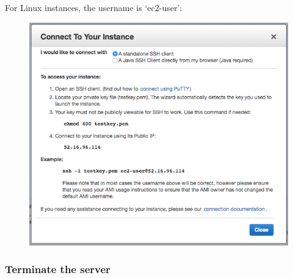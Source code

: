 For Linux instances, the username is `ec2-user':

\begin{Shaded}
\begin{Highlighting}[]
\NormalTok{$ } \KeywordTok{<}\KeywordTok{>} \KeywordTok{<}\KeywordTok{>}
\end{Highlighting}
\end{Shaded}

\begin{figure}[htbp]
\centering
\includegraphics{96Cloud/figures/connect_to_instance.png}
\end{figure}

\begin{Shaded}
\begin{Highlighting}[]
       \KeywordTok{__|}  \KeywordTok{__|_}  \NormalTok{)}
       \KeywordTok{_|} \DataTypeTok{\textbackslash{}(}     \KeywordTok{/}   
      \KeywordTok{___|}\DataTypeTok{\textbackslash{}\textbackslash{}}\KeywordTok{___|___|}

\NormalTok{[} \NormalTok{~]$}
\end{Highlighting}
\end{Shaded}

\subsubsection{Terminate the server}\label{terminate-the-server}

